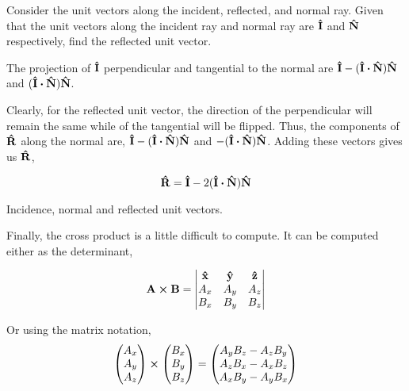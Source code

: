 \begin{example}
    Consider the unit vectors along the incident, reflected, and normal ray.
    Given that the unit vectors along the incident ray and normal ray are 
    \(\boldsymbol{\mathbf{\hat{I}}}\) and \(\boldsymbol{\mathbf{\hat{N}}}\) respectively, find the reflected unit vector.
    
    \begin{soln}
        The projection of \(\boldsymbol{\mathbf{\hat{I}}}\) perpendicular and tangential to the 
        normal are \(\unitv{I} - (\unitv{I} \dtp \unitv{N})\unitv{N}\) and \((\unitv{I} \dtp \unitv{N})\unitv{N}\).

        Clearly, for the reflected unit vector, the direction of the perpendicular will remain the same 
        while of the tangential will be flipped. Thus, the components of 
        \(\boldsymbol{\mathbf{\hat{R}}}\) along the normal are, \(\unitv{I} - (\unitv{I} \dtp \unitv{N})\unitv{N}\)
        and \(-(\unitv{I} \dtp \unitv{N})\unitv{N}\). Adding these vectors gives us \(\boldsymbol{\mathbf{\hat{R}}}\),

        \begin{equation*}
            \unitv{R} = \unitv{I} - 2(\unitv{I} \dtp \unitv{N})\unitv{N}
        \end{equation*}
    \end{soln}
\end{example}

\begin{marginfigure}
    \centering
    \caption{Incidence, normal and reflected unit vectors.}
\end{marginfigure}


Finally, the cross product is a little difficult to compute.
It can be computed either as the determinant,

\[\vec{A} \cp \vec{B} =
\begin{vmatrix}
    \unitv{x} & \unitv{y} & \unitv{z} \\
    A_x & A_y & A_z \\
    B_x & B_y & B_z
\end{vmatrix}\]

Or using the matrix notation,
\[
\begin{pmatrix}
    A_x \\
    A_y \\
    A_z
\end{pmatrix} \cp
%
\begin{pmatrix}
    B_x \\
    B_y \\
    B_z
\end{pmatrix}
%
=
%
\begin{pmatrix}
    A_yB_z - A_zB_y \\
    A_zB_x - A_xB_z \\
    A_xB_y - A_yB_x
\end{pmatrix}
\]

